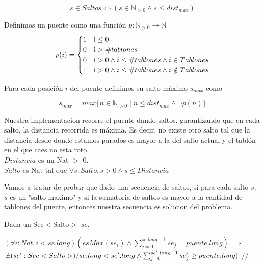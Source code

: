 \begin{displaymath}
	s \in Saltos \Leftrightarrow (s \in \mathbb{N}_{> 0} \land s \leq dist_{max})
\end{displaymath}

Definimos un puente como una función $p: \mathbb{N}_{>0} \to \mathbb{N}$ 
\begin{displaymath}
	p(i) = \begin{cases} 
					1 &\mbox i \leq 0 \\ 
					0 &\mbox i > \#tablones \\
					0 &\mbox i > 0 \land i \leq \#tablones \land i \in Tablones \\
					1 &\mbox i > 0 \land i \leq \#tablones \land i \notin Tablones \\
				\end{cases} %
\end{displaymath}

Para cada posición $i$ del puente definimos su salto máximo $s_{max}$ como 

\begin{displaymath}
	s_{max} = max \{n \in \mathbb{N}_{>0} \mid n \leq dist_{max} \land  \neg p(n)\}
\end{displaymath}

Nuestra implementacion recorre el puente dando saltos, garantizando que en cada salto, la distancia recorrida es m\'axima. Es decir, no existe otro salto tal que la distancia desde donde estamos parados es mayor a la del salto actual y el tabl\'on en el que caes no esta roto.\\
$Distancia$ es un Nat $>$ 0. \\
$Salto$ es Nat tal que $\forall s:Salto, s > 0 \wedge s \leq Distancia$
 
Vamos a tratar de probar que dado una secuencia de saltos, si para cada salto $s$, $s$ es un "salto maximo" y si la sumatoria de saltos es mayor a la cantidad de tablones del puente, entonces nuestra secuencia es solucion del problema.

Dada un Sec$<$Salto$>$ $se$.

$(\forall i:Nat, i < se.long)(esMax(se_{i}) \wedge \sum_{j=0}^{se.long-1}se_{j} = puente.long)\implies$ \\ $\not\exists (se':Sec<Salto>) /
se.long < se'.long \wedge \sum_{j=0}^{se'.long-1}se'_{j} \geq puente.long)$  //

